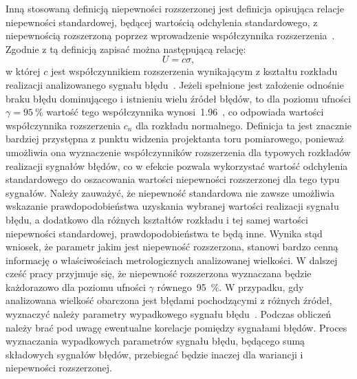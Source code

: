 Inną stosowaną definicją niepewności rozszerzonej jest definicja opisująca relacje niepewności standardowej, będącej wartością odchylenia standardowego, z niepewnością rozszerzoną poprzez wprowadzenie współczynnika rozszerzenia~\cite{jcgm_guide}. Zgodnie z tą definicją zapisać można następującą relację:
\begin{equation}
U = c \sigma \label{eq:unc_sum},
\end{equation}
w której $c$ jest współczynnikiem rozszerzenia wynikającym z kształtu rozkładu realizacji analizowanego sygnału błędu~\cite{horalek_shapes}. Jeżeli spełnione jest założenie odnośnie braku błędu dominującego i istnieniu wielu źródeł błędów, to dla poziomu ufności $\gamma = \qty{95}{\percent}$ wartość tego współczynnika wynosi~\num{1.96}~\cite{jcgm_guide}, co odpowiada wartości współczynnika rozszerzenia $c_{n}$ dla rozkładu normalnego. Definicja ta jest znacznie bardziej przystępna z punktu widzenia projektanta toru pomiarowego, ponieważ umożliwia ona wyznaczenie współczynników rozszerzenia dla typowych rozkładów realizacji sygnałów błędów, co w efekcie pozwala wykorzystać wartość odchylenia standardowego do oszacowania wartości niepewności rozszerzonej dla tego typu sygnałów. Należy zauważyć, że niepewność standardowa nie zawsze umożliwia wskazanie prawdopodobieństwa uzyskania wybranej wartości realizacji sygnału błędu, a dodatkowo dla różnych kształtów rozkładu i tej samej wartości niepewności standardowej, prawdopodobieństwa te będą inne. Wynika stąd wniosek, że parametr jakim jest niepewność rozszerzona, stanowi bardzo cenną informację o właściwościach metrologicznych analizowanej wielkości. W dalszej cześć pracy przyjmuje się, że niepewność rozszerzona wyznaczana będzie każdorazowo dla poziomu ufności $\gamma$ równego~\qty{95}{\percent}. W przypadku, gdy analizowana wielkość obarczona jest błędami pochodzącymi z różnych źródeł, wyznaczyć należy parametry wypadkowego sygnału błędu~\cite{wymyslo_range}. Podczas obliczeń należy brać pod uwagę ewentualne korelacje pomiędzy sygnałami błędów. Proces wyznaczania wypadkowych parametrów sygnału błędu, będącego sumą składowych sygnałów błędów, przebiegać będzie inaczej dla wariancji i niepewności rozszerzonej.

